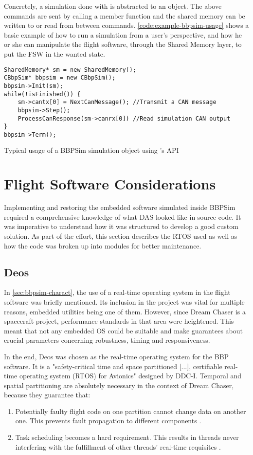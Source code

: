 {Concretely, a simulation done with  is abstracted to an object. The above commands are sent by calling a member function and the shared memory can be written to or read from between commands.  \autoref{code:example-bbpsim-usage} shows a basic example of how to run a simulation from a user's perspective, and how he or she can manipulate the flight software, through the Shared Memory layer, to put the FSW in the wanted state.
\begin{listing}[H]
	\begin{verbatim}
SharedMemory* sm = new SharedMemory();
CBbpSim* bbpsim = new CBbpSim();
bbpsim->Init(sm);
while(!isFinished()) {
	sm->cantx[0] = NextCanMessage(); //Transmit a CAN message
	bbpsim->Step();
	ProcessCanResponse(sm->canrx[0]) //Read simulation CAN output
}
bbpsim->Term();
	\end{verbatim}
	\caption{Typical usage of a BBPSim simulation object using 's API}
	\label{code:example-bbpsim-usage}
\end{listing}

\section{Flight Software Considerations}\label{sec:fsw-outline}
Implementing and restoring the embedded software simulated inside \gls{BBPSim} required a comprehensive knowledge of what DAS looked like in source code. It was imperative to understand how it was structured to develop a good custom solution.  As part of the effort, this section describes the RTOS used as well as how the code was broken up into modules for better maintenance.

\subsection*{Deos}
In \autoref{sec:bbpsim-charact}, the use of a real-time operating system in the flight software was briefly mentioned. Its inclusion in the project was vital for multiple reasons, embedded utilities being one of them. However, since Dream Chaser is a spacecraft project, performance standards in that area were heightened. This meant that not any embedded OS could be suitable and make guarantees about crucial parameters concerning robustness, timing and responsiveness.

In the end, Deos was chosen as the real-time operating system for the BBP software. It is a "safety-critical time and space partitioned [...], certifiable real-time operating system (RTOS) for Avionics" designed by DDC-I\cite{on:ddci}. Temporal and spatial partitioning are absolutely necessary in the context of Dream Chaser, because they guarantee that:
\begin{enumerate}
	\item Potentially faulty flight code on one partition cannot change data on another one. This prevents fault propagation to different components \cite{reiger}.
	\item Task scheduling becomes a hard requirement. This results in threads never interfering with the fulfillment of other threads' real-time requisites \cite{rufino}.
\end{enumerate}

}
